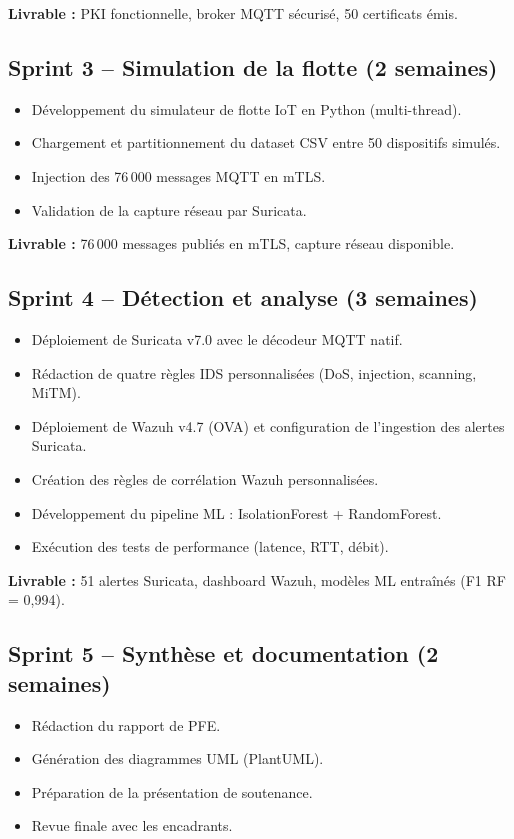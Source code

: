 \textbf{Livrable :} PKI fonctionnelle, broker MQTT sécurisé, 50 certificats émis.

\subsection{Sprint 3 -- Simulation de la flotte (2 semaines)}

\begin{itemize}
  \item Développement du simulateur de flotte IoT en Python (multi-thread).
  \item Chargement et partitionnement du dataset CSV entre 50 dispositifs simulés.
  \item Injection des 76\,000 messages MQTT en mTLS.
  \item Validation de la capture réseau par Suricata.
\end{itemize}

\textbf{Livrable :} 76\,000 messages publiés en mTLS, capture réseau disponible.

\subsection{Sprint 4 -- Détection et analyse (3 semaines)}

\begin{itemize}
  \item Déploiement de Suricata v7.0 avec le décodeur MQTT natif.
  \item Rédaction de quatre règles IDS personnalisées (DoS, injection, scanning, MiTM).
  \item Déploiement de Wazuh v4.7 (OVA) et configuration de l'ingestion des alertes Suricata.
  \item Création des règles de corrélation Wazuh personnalisées.
  \item Développement du pipeline ML : IsolationForest + RandomForest.
  \item Exécution des tests de performance (latence, RTT, débit).
\end{itemize}

\textbf{Livrable :} 51 alertes Suricata, dashboard Wazuh, modèles ML entraînés (F1 RF = 0,994).

\subsection{Sprint 5 -- Synthèse et documentation (2 semaines)}

\begin{itemize}
  \item Rédaction du rapport de PFE.
  \item Génération des diagrammes UML (PlantUML).
  \item Préparation de la présentation de soutenance.
  \item Revue finale avec les encadrants.
\end{itemize}

